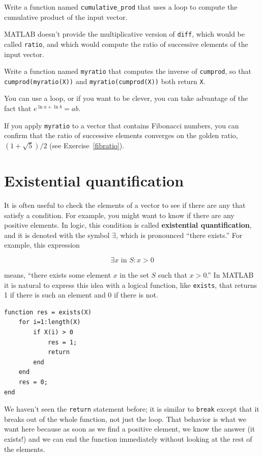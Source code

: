 \documentclass{book}
\begin{document}
\begin{ex}
Write a function named {\tt cumulative\_prod} that uses
a loop to compute the cumulative product of the input vector.
\end{ex}

MATLAB doesn't provide the multiplicative version
of {\tt diff}, which would be called {\tt ratio}, and which would
compute the ratio of successive elements of the input vector.

\begin{ex}
Write a function named {\tt myratio} that computes the
inverse of {\tt cumprod}, so that {\tt cumprod(myratio(X))} and
{\tt myratio(cumprod(X))} both
return {\tt X}.

You can use a loop, or if you want to be clever, you can take
advantage of the fact that $e^{\ln a + \ln b} = a b$.

If you apply {\tt myratio} to a vector that contains Fibonacci
numbers, you can confirm that the ratio of successive elements
converges on the golden ratio, $(1+\sqrt{5})/2$ (see
Exercise~\ref{fibratio}).
\end{ex}



\section{Existential quantification}

It is often useful to check the elements of a vector to see if there
are any that satisfy a condition.  For example, you might want to
know if there are any positive elements.  In logic, this condition
is called {\bf existential quantification}, and it is denoted with
the symbol $\exists$, which is pronounced ``there exists.''  For example,
this expression

\[ \exists x \mbox{~in~} S: x>0 \]

means, ``there exists some element $x$ in the set $S$ such that
$x>0$.''  In MATLAB it is natural to express this idea with a logical
function, like {\tt exists}, that returns 1 if there is such an
element and 0 if there is not.

\begin{verbatim}
function res = exists(X)
    for i=1:length(X)
        if X(i) > 0
            res = 1;
            return
        end
    end
    res = 0;
end
\end{verbatim}

We haven't seen the {\tt return} statement before; it is similar
to {\tt break} except that it breaks out of the whole function, not
just the loop.  That behavior is what we want here because as soon
as we find a positive element, we know the answer (it exists!) and
we can end the function immediately without looking at the rest
of the elements.
\end{document}
